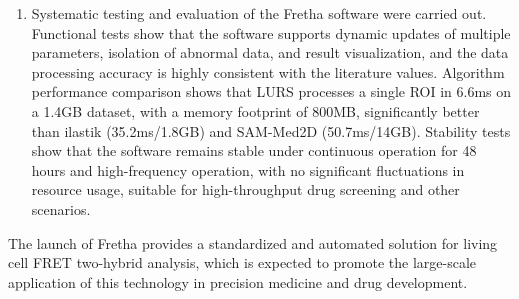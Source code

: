\begin{eabstract}
\begin{enumerate}
  \item Systematic testing and evaluation of the Fretha software were carried out. Functional tests show that the software supports dynamic updates of multiple parameters, isolation of abnormal data, and result visualization, and the data processing accuracy is highly consistent with the literature values. Algorithm performance comparison shows that LURS processes a single ROI in 6.6ms on a 1.4GB dataset, with a memory footprint of 800MB, significantly better than ilastik (35.2ms/1.8GB) and SAM-Med2D (50.7ms/14GB). Stability tests show that the software remains stable under continuous operation for 48 hours and high-frequency operation, with no significant fluctuations in resource usage, suitable for high-throughput drug screening and other scenarios.
\end{enumerate}

The launch of Fretha provides a standardized and automated solution for living cell FRET two-hybrid analysis, which is expected to promote the large-scale application of this technology in precision medicine and drug development.

\fi
\end{eabstract}


